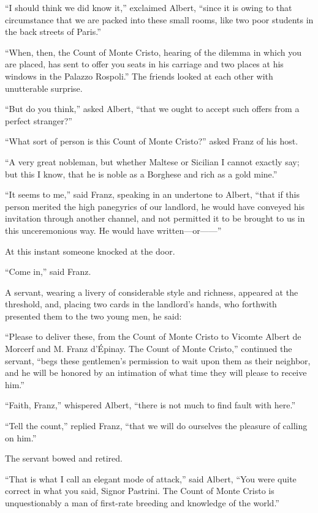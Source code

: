 “I should think we did know it,” exclaimed Albert, “since it is owing
to that circumstance that we are packed into these small rooms, like
two poor students in the back streets of Paris.”

“When, then, the Count of Monte Cristo, hearing of the dilemma in which
you are placed, has sent to offer you seats in his carriage and two
places at his windows in the Palazzo Rospoli.” The friends looked at
each other with unutterable surprise.

“But do you think,” asked Albert, “that we ought to accept such offers
from a perfect stranger?”

“What sort of person is this Count of Monte Cristo?” asked Franz of his
host.

“A very great nobleman, but whether Maltese or Sicilian I cannot
exactly say; but this I know, that he is noble as a Borghese and rich
as a gold mine.”

“It seems to me,” said Franz, speaking in an undertone to Albert, “that
if this person merited the high panegyrics of our landlord, he would
have conveyed his invitation through another channel, and not permitted
it to be brought to us in this unceremonious way. He would have
written—or——”

At this instant someone knocked at the door.

“Come in,” said Franz.

A servant, wearing a livery of considerable style and richness,
appeared at the threshold, and, placing two cards in the landlord’s
hands, who forthwith presented them to the two young men, he said:

“Please to deliver these, from the Count of Monte Cristo to Vicomte
Albert de Morcerf and M. Franz d’Épinay. The Count of Monte Cristo,”
continued the servant, “begs these gentlemen’s permission to wait upon
them as their neighbor, and he will be honored by an intimation of what
time they will please to receive him.”

“Faith, Franz,” whispered Albert, “there is not much to find fault with
here.”

“Tell the count,” replied Franz, “that we will do ourselves the
pleasure of calling on him.”

The servant bowed and retired.

“That is what I call an elegant mode of attack,” said Albert, “You were
quite correct in what you said, Signor Pastrini. The Count of Monte
Cristo is unquestionably a man of first-rate breeding and knowledge of
the world.”

